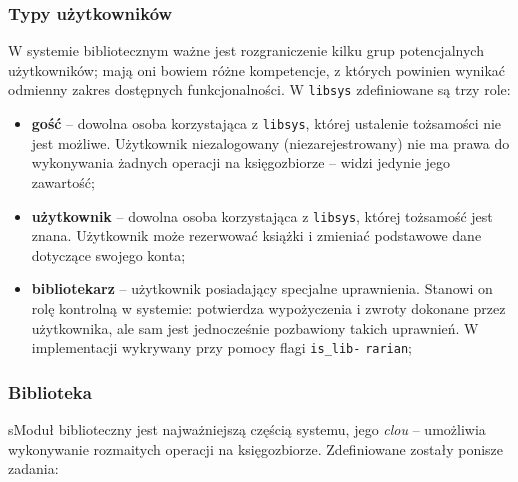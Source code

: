 \documentclass[12pt, a4paper]{article}
\begin{document}
\subsubsection{Typy użytkowników}
\label{libsys_roles}
W systemie bibliotecznym ważne jest rozgraniczenie kilku grup potencjalnych użytkowników; mają oni bowiem różne kompetencje, z których powinien wynikać odmienny zakres dostępnych funkcjonalności. W \texttt{libsys} zdefiniowane są trzy role:

\begin{itemize}
    \label{libsys_roles}
    \item \textbf{gość} -- dowolna osoba korzystająca z \texttt{libsys}, której ustalenie tożsamości nie jest możliwe. Użytkownik niezalogowany (niezarejestrowany) nie ma prawa do wykonywania żadnych operacji na księgozbiorze -- widzi jedynie jego zawartość;
    \item \textbf{użytkownik} -- dowolna osoba korzystająca z \texttt{libsys}, której tożsamość jest znana. Użytkownik może rezerwować książki i zmieniać podstawowe dane dotyczące swojego konta;
    \item \textbf{bibliotekarz} -- użytkownik posiadający specjalne uprawnienia. Stanowi on rolę kontrolną w systemie: potwierdza wypożyczenia i zwroty dokonane przez użytkownika, ale sam jest jednocześnie pozbawiony takich uprawnień. W implementacji wykrywany przy pomocy flagi \texttt{is\_lib-} \texttt{rarian};
\end{itemize}

\subsubsection{Biblioteka}
\label{libsys_book_status}
sModuł biblioteczny jest najważniejszą częścią systemu, jego \textit{clou} -- umożliwia wykonywanie rozmaitych operacji na księgozbiorze. Zdefiniowane zostały ponisze zadania:
\end{document}
